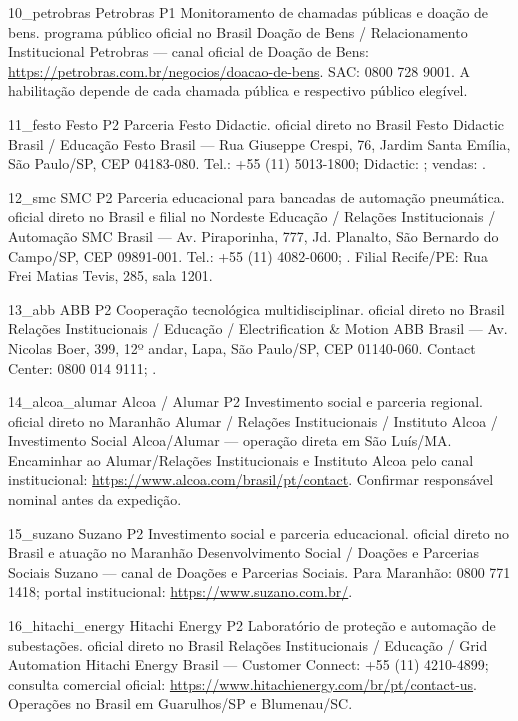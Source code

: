 \ContatoEmpresa
  {10_petrobras}
  {Petrobras}
  {P1}
  {Monitoramento de chamadas públicas e doação de bens.}
  {programa público oficial no Brasil}
  {Doação de Bens / Relacionamento Institucional}
  {Petrobras — canal oficial de Doação de Bens: \url{https://petrobras.com.br/negocios/doacao-de-bens}. SAC: 0800 728 9001. A habilitação depende de cada chamada pública e respectivo público elegível.}

\ContatoEmpresa
  {11_festo}
  {Festo}
  {P2}
  {Parceria Festo Didactic.}
  {oficial direto no Brasil}
  {Festo Didactic Brasil / Educação}
  {Festo Brasil — Rua Giuseppe Crespi, 76, Jardim Santa Emília, São Paulo/SP, CEP 04183-080. Tel.: +55 (11) 5013-1800; Didactic: ; vendas: .}

\ContatoEmpresa
  {12_smc}
  {SMC}
  {P2}
  {Parceria educacional para bancadas de automação pneumática.}
  {oficial direto no Brasil e filial no Nordeste}
  {Educação / Relações Institucionais / Automação}
  {SMC Brasil — Av. Piraporinha, 777, Jd. Planalto, São Bernardo do Campo/SP, CEP 09891-001. Tel.: +55 (11) 4082-0600; . Filial Recife/PE: Rua Frei Matias Tevis, 285, sala 1201.}

\ContatoEmpresa
  {13_abb}
  {ABB}
  {P2}
  {Cooperação tecnológica multidisciplinar.}
  {oficial direto no Brasil}
  {Relações Institucionais / Educação / Electrification \& Motion}
  {ABB Brasil — Av. Nicolas Boer, 399, 12º andar, Lapa, São Paulo/SP, CEP 01140-060. Contact Center: 0800 014 9111; .}

\ContatoEmpresa
  {14_alcoa_alumar}
  {Alcoa / Alumar}
  {P2}
  {Investimento social e parceria regional.}
  {oficial direto no Maranhão}
  {Alumar / Relações Institucionais / Instituto Alcoa / Investimento Social}
  {Alcoa/Alumar — operação direta em São Luís/MA. Encaminhar ao Alumar/Relações Institucionais e Instituto Alcoa pelo canal institucional: \url{https://www.alcoa.com/brasil/pt/contact}. Confirmar responsável nominal antes da expedição.}

\ContatoEmpresa
  {15_suzano}
  {Suzano}
  {P2}
  {Investimento social e parceria educacional.}
  {oficial direto no Brasil e atuação no Maranhão}
  {Desenvolvimento Social / Doações e Parcerias Sociais}
  {Suzano — canal de Doações e Parcerias Sociais. Para Maranhão: 0800 771 1418; portal institucional: \url{https://www.suzano.com.br/}.}

\ContatoEmpresa
  {16_hitachi_energy}
  {Hitachi Energy}
  {P2}
  {Laboratório de proteção e automação de subestações.}
  {oficial direto no Brasil}
  {Relações Institucionais / Educação / Grid Automation}
  {Hitachi Energy Brasil — Customer Connect: +55 (11) 4210-4899; consulta comercial oficial: \url{https://www.hitachienergy.com/br/pt/contact-us}. Operações no Brasil em Guarulhos/SP e Blumenau/SC.}

